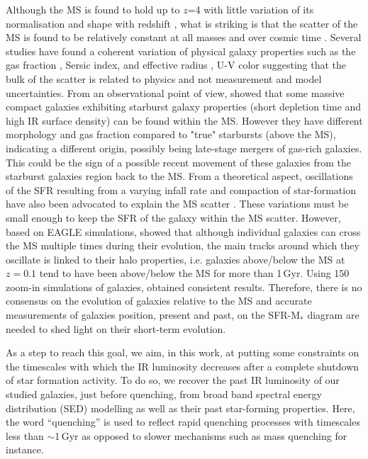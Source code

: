 \documentclass[traditabstract]{aa} %
\begin{document}
Although the MS is found to hold up to $z$=4 \citep{Schreiber17} with little variation of its normalisation and shape with redshift \citep{Daddi07,Pannella09,Elbaz11,Rodighiero11,Speagle14,Whitaker14,Schreiber15,Gavazzi15,Tomczak16}, what is striking is that the scatter of the MS is found to be relatively constant at all masses and over cosmic time \citep{Guo13,Ilbert15,Schreiber15}.
Several studies have found a coherent variation of physical galaxy properties such as the gas fraction \citep{Magdis12}, Sersic index, and effective radius \citep{Wuyts11}, U-V color \citep[e.g.,][]{Salmi12} suggesting that the bulk of the scatter is related to physics and not measurement and model uncertainties. 
From an observational point of view, \cite{Elbaz18} showed that some massive compact galaxies exhibiting starburst galaxy properties (short depletion time and high IR surface density) can be found within the MS.
However they have different morphology and gas fraction compared to "true" starbursts (above the MS), indicating a different origin, possibly  being late-stage mergers of gas-rich galaxies.
This could be the sign of a possible recent movement of these galaxies from the starburst galaxies region back to the MS.
From a theoretical aspect, oscillations of the SFR resulting from a varying infall rate and compaction of star-formation have also been advocated to explain the MS scatter \citep[e.g.,][]{DekelBurkert14,Sargent14,Scoville16,Tacchella16}.
These variations must be small enough to keep the SFR of the galaxy within the MS scatter.
However, based on EAGLE simulations, \cite{Matthee19} showed that although individual galaxies can cross the MS multiple times during their evolution, the main tracks around which they oscillate is linked to their halo properties, i.e. galaxies above/below the MS at $z=0.1$ tend to have been above/below the MS for more than 1\,Gyr.
Using 150 zoom-in simulations of galaxies, \cite{Blank21} obtained consistent results.
Therefore, there is no consensus on the evolution of galaxies relative to the MS and accurate measurements of galaxies position, present and past, on the SFR-M$_*$ diagram are needed to shed light on their short-term evolution.

As a step to reach this goal, we aim, in this work, at putting some constraints on the timescales with which the IR luminosity decreases after a complete shutdown of star formation activity.
To do so, we recover the past IR luminosity of our studied galaxies, just before quenching, from broad band spectral energy distribution (SED) modelling as well as their past star-forming properties.
Here, the word ``quenching'' is used to reflect rapid quenching processes with timescales less than $\sim$1\,Gyr as opposed to slower mechanisms such as mass quenching for instance.
\end{document}
